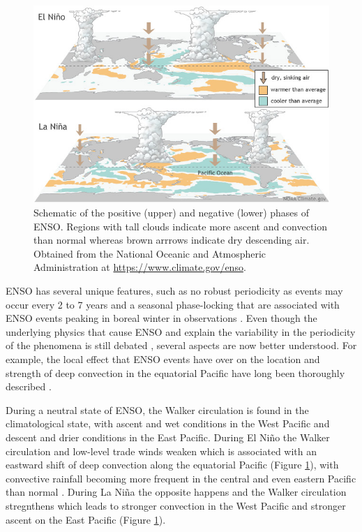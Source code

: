\begin{figure}[t!]
\centering
\includegraphics[width=\linewidth]{figures/ENSO}
\caption[El Niño Southern Oscillation and the Walker circulation]{Schematic of the positive (upper) and negative (lower) phases of ENSO. Regions with tall clouds indicate more ascent and convection than normal whereas brown arrrows indicate dry descending air. Obtained from the National Oceanic and Atmospheric Administration at \url{https://www.climate.gov/enso}. }
\label{fig:enso}
\end{figure}  
 ENSO has several unique features, such as no robust periodicity as events may occur every 2 to 7 years and a seasonal phase-locking that are associated with ENSO events peaking in boreal winter in observations \citep{wang2004}. Even though the underlying physics that cause ENSO and explain the variability in the periodicity of the phenomena is still debated \citep{wang2004,christensen2017}, several aspects are now better understood. 
For example, the local effect that ENSO events have over on the location and strength of deep convection in the equatorial Pacific have long been thoroughly described \citep{trenberth1997,neelin1998}. 

During a neutral state of ENSO, the Walker circulation is found in the climatological state, with ascent and wet conditions in the West Pacific  and descent and drier conditions in the East Pacific. During El Niño the Walker circulation and low-level trade winds weaken which is associated with an eastward shift of deep convection along the equatorial Pacific (Figure \ref{fig:enso}), with convective rainfall becoming more frequent in the central and even eastern Pacific than normal \citep{neelin1998,wang2004}. During La Niña the opposite happens and the Walker circulation stregnthens which leads to stronger convection in the West Pacific and stronger ascent on the East Pacific (Figure \ref{fig:enso}). 


